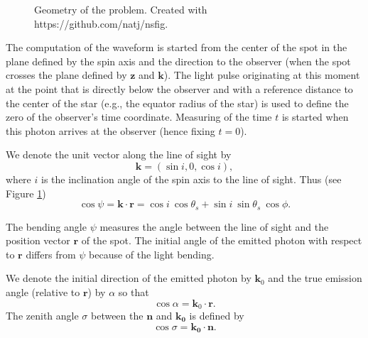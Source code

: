 \documentclass{wihuri}
\def\be{\begin{equation}}
\def\ee{\end{equation}}
\def\thetas{\theta_{s}}
\newcommand{\bmath}[1]{\boldsymbol{#1}}
\begin{document}
\begin{figure}
\centerline{}
\caption{Geometry of the problem. Created with https://github.com/natj/nsfig. %
\label{fig:geom2}}
\end{figure}



The computation of the waveform is started from the center of the spot in the plane defined by the spin axis and the direction to the observer 
(when the spot crosses the plane defined by $\bmath{z}$ and $\bmath{k}$). The light pulse originating at this moment at the point that is directly below the observer and with a reference distance to the center of the star (e.g., the equator radius of the star) is used to define the zero of the observer's time coordinate. Measuring of the time $t$ is started when this photon arrives at the observer (hence fixing $t=0$). %



We denote the unit vector along the line of sight by 
\be
\bmath{k}=(\sin i, 0, \cos i), 
\ee 
where $i$ is the inclination angle of the spin axis to the line of sight. 
Thus (see Figure \ref{fig:geom2})
\be \label{eq:psi2}
  \cos\psi=\bmath{k}\cdot \bmath{r} = \cos i\ \cos\thetas+\sin i\ \sin \thetas\ \cos\phi.
\ee

The bending angle $\psi$ measures the angle between the line of sight and the position vector $\bmath{r}$ of the spot. The initial angle of the emitted photon with respect to
 ${\mathbf r}$ differs from $\psi$ because of the light bending.



We denote the initial direction of the emitted photon by $\bmath{k}_0$ %
and the true emission angle (relative to $\bmath{r}$) by $\alpha$ so that
\be
 \cos\alpha=\bmath{k}_0 \cdot \bmath{r}.
\ee
The zenith angle $\sigma$ between the $\bmath{n}$ and $\bmath{k_{0}}$ is defined by 
\be
\cos\sigma = \bmath{k_{0}}\cdot\bmath{n}.
\ee
\end{document}
